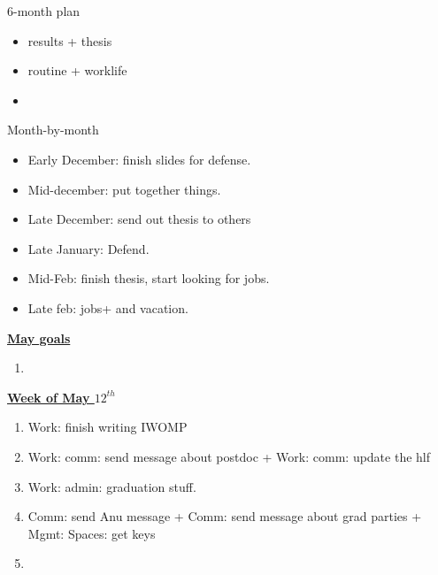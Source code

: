 \documentclass[serif, mathserif, final]{beamer}
\begin{document}
\begin{frame}{}
\begin{columns}
\begin{column}{0.5\linewidth}
    \begin{block}{ 6-month plan}
      \begin{itemize}
        \small \item \small results + thesis
      \item \small routine + worklife
      \item \small 
      \end{itemize}
    \end{block} 

    \begin{block}{Month-by-month}
      \begin{itemize}
      \item \small Early December: finish slides for defense.
      \item \small Mid-december: put together things. 
      \item \small Late December: send out thesis to others 
      \item \small Late January: Defend.
      \item \small Mid-Feb: finish thesis, start looking for jobs. 
      \item \small Late feb: jobs+ and vacation. 
      \end{itemize}
    \end{block}

\begin{block}{\underline{\textbf{May goals}}}
\begin{enumerate}
\small \item \small 
\end{enumerate}
\end{block}

\begin{block}{\small \underline{\textbf{Week of May $12^{th}$}}}
\begin{enumerate}
\tiny \item \tiny Work: finish writing IWOMP
\item \tiny Work: comm: send message about postdoc    + Work: comm:
  update the hlf 
\item \tiny Work: admin: graduation stuff. 
\item \tiny Comm: send Anu message  + Comm: send message about grad
  parties  + Mgmt: Spaces: get keys 
\item \tiny 
\end{enumerate}
\end{block}


\end{column}
\end{columns}
\end{frame}
\end{document}
